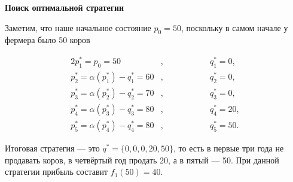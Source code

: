 \begin{enumerate}
	\bigskip
	
	\textbf{Поиск оптимальной стратегии}
	
	Заметим, что наше начальное состояние $p_0 = 50$, поскольку в самом начале у фермера было 50 коров
	
	\begin{alignat*}{2}
		p_1^* = p_0 = 50&, \qquad\qquad &&q_1^* = 0, \\
		p_2^* = \alpha(p_1^*) - q^*_1 = 60 &, &&q_2^* = 0, \\
		p_3^* = \alpha(p_2^*) - q^*_2 = 70 &, &&q_3^* = 0, \\
		p_4^* = \alpha(p_3^*) - q^*_3 = 80 &, &&q_4^* = 20, \\
		p_5^* = \alpha(p_4^*) - q^*_4 = 80 &, &&q_5^* = 50.
	\end{alignat*}
	
	Итоговая стратегия --- это $q^* = \{0, 0, 0, 20, 50\}$, то есть в первые три года не продавать коров, в четвёртый год продать 20, а в пятый --- 50. При данной стратегии прибыль составит $f_1(50) = 40$.
\end{enumerate}

